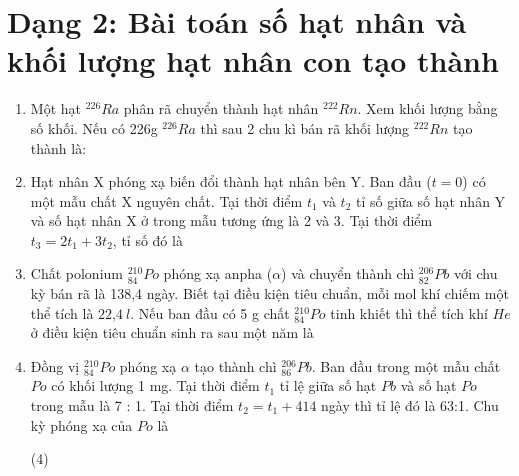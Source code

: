 \section{Dạng 2: Bài toán số hạt nhân và khối lượng hạt nhân con tạo thành}	
\begin{enumerate}
	\item {Một hạt $^{226}Ra$ phân rã chuyển thành hạt nhân $^{222} Rn$. Xem khối lượng bằng số khối. Nếu có 226g $^{226}Ra$ thì sau 2 chu kì bán rã khối lượng $^{222} Rn$ tạo thành là:
	}
	\item {Hạt nhân X phóng xạ biến đổi thành hạt nhân bên Y. Ban đầu ($t = 0$) có một mẫu chất X nguyên chất. Tại thời điểm $t_1$ và $t_2$ tỉ số giữa số hạt nhân Y và số hạt nhân X ở trong mẫu tương ứng là 2 và 3. Tại thời điểm $t_3 =2t_1 +3t_2$, tỉ số đó là
	}
	\item{Chất polonium $^{210}_{84} Po$ phóng xạ anpha ($\alpha$) và chuyển thành chì $^{206}_{82} Pb$ với chu kỳ bán rã là 138,4 ngày. Biết tại điều kiện tiêu chuẩn, mỗi mol khí chiếm một thể tích là $\text{22,4}\ l$. Nếu ban đầu có 5 g chất $^{210}_{84} Po$ tinh khiết thì thể tích khí $He$ ở điều kiện tiêu chuẩn sinh ra sau một năm là
	}
	\item{Đồng vị $^{210}_{84} Po$ phóng xạ $\alpha$ tạo thành chì $^{206}_{86}Pb$. Ban đầu trong một mẫu chất $Po$ có khối lượng 1 mg. Tại thời điểm $t_1$ tỉ lệ giữa số hạt $Pb$ và số hạt $Po$ trong mẫu là 7 : 1. Tại thời điểm $t_2=t_1 + 414$ ngày thì tỉ lệ đó là 63:1. Chu kỳ phóng xạ của $Po$ là
		\begin{mcq}(4)

\end{mcq}}
\end{enumerate}

